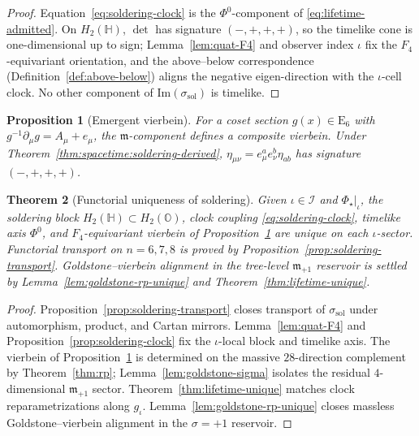 \documentclass[aps,prd,onecolumn,amsmath,amssymb,nofootinbib,11pt]{revtex4-2}
\numberwithin{equation}{section}
\theoremstyle{plain}
\newtheorem{theorem}{Theorem}[section]
\newtheorem{proposition}[theorem]{Proposition}
\theoremstyle{definition}
\theoremstyle{remark}
\newcommand{\Quat}{\mathbb{H}}
\newcommand{\Oct}{\mathbb{O}}
\newcommand{\E}[1]{\mathrm{E}_{#1}}
\newcommand{\orderparam}{\Phi}
\begin{document}
\begin{proof}
Equation~\eqref{eq:soldering-clock} is the $\orderparam^0$-component of
\eqref{eq:lifetime-admitted}. On $H_2(\Quat)$, $\det$ has signature
$(-,+,+,+)$, so the timelike cone is one-dimensional up to sign;
Lemma~\ref{lem:quat-F4} and observer index $\iota$ fix the
$F_4$-equivariant orientation, and the above--below correspondence
(Definition~\ref{def:above-below}) aligns the negative eigen-direction
with the $\iota$-cell clock. No other component of
$\mathrm{Im}(\sigma_{\mathrm{sol}})$ is timelike.
\end{proof}

\begin{proposition}[Emergent vierbein]\label{prop:vierbein}
For a coset section $g(x)\in\E{6}$ with $g^{-1}\partial_\mu g=A_\mu+e_\mu$,
the $\mathfrak{m}$-component defines a composite vierbein. Under
Theorem~\ref{thm:spacetime:soldering-derived},
$\eta_{\mu\nu}=e^a_\mu e^b_\nu\eta_{ab}$ has signature $(-,+,+,+)$.
\end{proposition}

\begin{theorem}[Functorial uniqueness of soldering]
\label{thm:soldering-unique}
Given $\iota\in\mathcal{I}$ and $\orderparam_\star|_\iota$, the soldering
block $H_2(\Quat)\subset H_2(\Oct)$, clock coupling
\eqref{eq:soldering-clock}, timelike axis $\orderparam^0$, and
$F_4$-equivariant vierbein of Proposition~\ref{prop:vierbein} are unique on
each $\iota$-sector. Functorial transport on $n=6,7,8$ is proved by
Proposition~\ref{prop:soldering-transport}. Goldstone--vierbein alignment in
the tree-level $\mathfrak{m}_{+1}$ reservoir is settled by
Lemma~\ref{lem:goldstone-rp-unique} and
Theorem~\ref{thm:lifetime-unique}.
\end{theorem}

\begin{proof}
Proposition~\ref{prop:soldering-transport} closes transport of
$\sigma_{\mathrm{sol}}$ under automorphism, product, and Cartan mirrors.
Lemma~\ref{lem:quat-F4} and Proposition~\ref{prop:soldering-clock} fix the
$\iota$-local block and timelike axis. The vierbein of
Proposition~\ref{prop:vierbein} is determined on the massive $28$-direction
complement by Theorem~\ref{thm:rp}; Lemma~\ref{lem:goldstone-sigma}
isolates the residual $4$-dimensional $\mathfrak{m}_{+1}$ sector.
Theorem~\ref{thm:lifetime-unique} matches clock reparametrizations along
$g_\iota$. Lemma~\ref{lem:goldstone-rp-unique} closes massless
Goldstone--vierbein alignment in the $\sigma=+1$ reservoir.
\end{proof}
\end{document}
